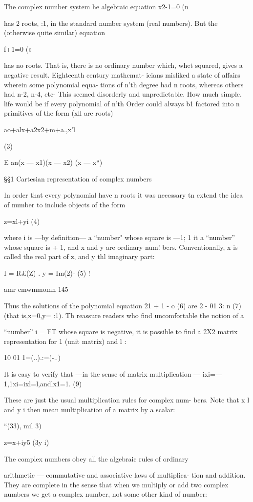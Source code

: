 The complex number system
he algebraic equation
x2-1=0 (n

has 2 roots, :1, in the standard number system (real numbers).
But the (otherwise quite similar) equation

f+1=0 (»

has no roots. That is, there is no ordinary number which, whet
squared, gives a negative result. Eighteenth century mathemat-
icians misliked a state of affairs wherein some polynomial equa-
tions of n’th degree had n roots, whereas others had n-2, n-4, etc-
This seemed disorderly and unpredictable. How much simple.
life would be if every polynomial of n’th Order could always b1
factored into n primitives of the form (xll are roots)

ao+alx+a2x2+m+a.,x'l

(3)

E an(x — x1)(x — x2) (x — x“)

§§1 Cartesian representation of complex numbers

In order that every polynomial have n roots it was necessary tn
extend the idea of number to include objects of the form

z=xl+yi (4)

where i is —by definition— a “number" whose square is —1; 1 it
a “number” whose square is + 1, and x and y are ordinary num!
bers. Conventionally, x is called the real part of z, and y thl
imaginary part:

I = R£(Z) . y = Im(2)- (5) !

amr-cmwmmomn 145

Thus the solutions of the polynomial equation
21 + 1 - o (6)
are
2 - 01 3: n (7)
(that is,x=0,y= :1).
Tb reassure readers who ﬁnd uncomfortable the notion of a

“number” i = FT whose square is negative, it is possible to ﬁnd
a 2X2 matrix representation for 1 (unit matrix) and l :

10 01
1=(..).:=(-..)

It is easy to verify that —in the sense of matrix multiplication —
ixi=—1,1xi=ixl=l,andlx1=1. (9)

These are just the usual multiplication rules for complex num-
bers. Note that x l and y i then mean multiplication of a matrix
by a scalar:

“(33), mil 3)

z=x+iy5 (3y i)

The complex numbers obey all the algebraic rules of ordinary

arithmetic — commutative and associative laws of multiplica-
tion and addition. They are complete in the sense that when we
multiply or add two complex numbers we get a complex number,
not some other kind of number:

